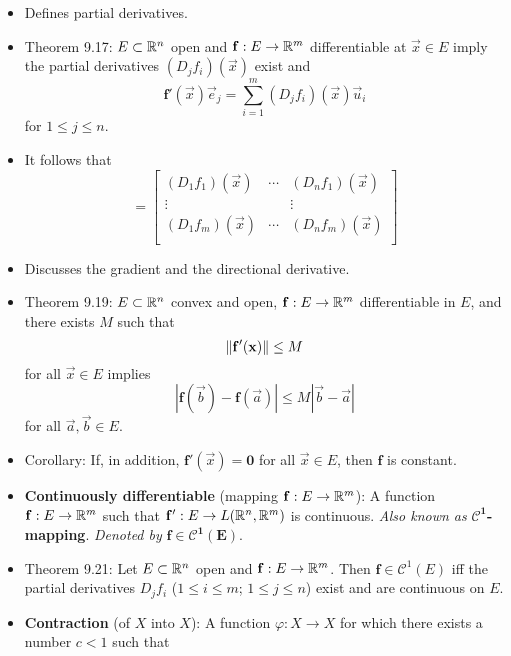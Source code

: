 \documentclass[../notes.tex]{subfiles}
\begin{document}
\begin{itemize}
    \item Defines partial derivatives.
    \item Theorem 9.17: $E\subset\mathbb{R}^n$ open and $\mathbf{f}:E\to\mathbb{R}^m$ differentiable at $\vec{x}\in E$ imply the partial derivatives $(D_jf_i)(\vec{x})$ exist and
    \begin{equation*}
        \mathbf{f}'(\vec{x})\vec{e}_j = \sum_{i=1}^m(D_jf_i)(\vec{x})\vec{u}_i
    \end{equation*}
    for $1\leq j\leq n$.
    \item It follows that
    \begin{equation*}
        [\mathbf{f}'(\vec{x})] =
        \begin{bmatrix}
            (D_1f_1)(\vec{x}) & \cdots & (D_nf_1)(\vec{x})\\
            \vdots &  & \vdots\\
            (D_1f_m)(\vec{x}) & \cdots & (D_nf_m)(\vec{x})\\
        \end{bmatrix}
    \end{equation*}
    \item Discusses the gradient and the directional derivative.
    \item Theorem 9.19: $E\subset\mathbb{R}^n$ convex and open, $\mathbf{f}:E\to\mathbb{R}^m$ differentiable in $E$, and there exists $M$ such that
    \begin{equation*}
        \norm{\mathbf{f}'(\mathbf{x})} \leq M
    \end{equation*}
    for all $\vec{x}\in E$ implies
    \begin{equation*}
        |\mathbf{f}(\vec{b})-\mathbf{f}(\vec{a})| \leq M|\vec{b}-\vec{a}|
    \end{equation*}
    for all $\vec{a},\vec{b}\in E$.
    \item Corollary: If, in addition, $\mathbf{f}'(\vec{x})=\bm{0}$ for all $\vec{x}\in E$, then $\mathbf{f}$ is constant.
    \item \textbf{Continuously differentiable} (mapping $\mathbf{f}:E\to\mathbb{R}^m$): A function $\mathbf{f}:E\to\mathbb{R}^m$ such that $\mathbf{f}':E\to L(\mathbb{R}^n,\mathbb{R}^m)$ is continuous. \emph{Also known as} \textbf{$\bm{\pmb{\mathscr{C}}^1}$-mapping}. \emph{Denoted by} $\bm{\mathbf{f}\in\pmb{\mathscr{C}}^1(E)}$.
    \item Theorem 9.21: Let $E\subset\mathbb{R}^n$ open and $\mathbf{f}:E\to\mathbb{R}^m$. Then $\mathbf{f}\in\mathscr{C}^1(E)$ iff the partial derivatives $D_jf_i$ ($1\leq i\leq m$; $1\leq j\leq n$) exist and are continuous on $E$.
    \item {}\textbf{Contraction} (of $X$ into $X$): A function $\varphi:X\to X$ for which there exists a number $c<1$ such that

\end{itemize}
\end{document}
